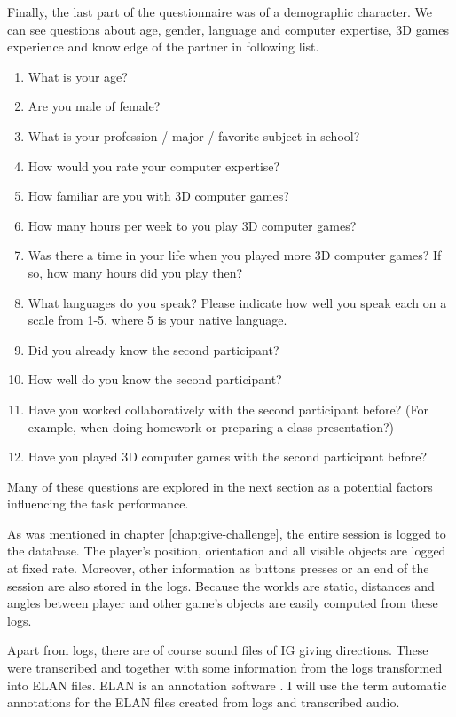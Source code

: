 Finally, the last part of the questionnaire was of a demographic character. We can see questions about age, gender, language and computer expertise, 3D games experience and knowledge of the partner in following list.

\begin{table}
\begin{enumerate}
\item
What is your age?
\item
Are you male of female?
\item
What is your profession / major / favorite subject in school?
\item
How would you rate your computer expertise?
\item
How familiar are you with 3D computer games?
\item
How many hours per week to you play 3D computer games?
\item
Was there a time in your life when you played more 3D computer games? If so, how many hours did you play then?
\item
What languages do you speak? Please indicate how well you speak each on a scale from 1-5, where 5 is your native language.
\item
Did you already know the second participant?
\item
How well do you know the second participant?
\item
Have you worked collaboratively with the second participant before? (For example, when doing homework or preparing a class presentation?)
\item
Have you played 3D computer games with the second participant before?
\end{enumerate}
\end{table}

Many of these questions are explored in the next section as a potential factors influencing the task performance. 

As was mentioned in chapter \ref{chap:give-challenge}, the entire session is logged to the database. The player's position, orientation and all visible objects are logged at fixed rate. Moreover, other information as buttons presses or an end of the session are also stored in the logs. Because the worlds are static, distances and angles between player and other game's objects are easily computed from these logs.

Apart from logs, there are of course sound files of IG giving directions. These were transcribed and together with some information from the logs transformed into ELAN files. ELAN is an annotation software \citep{sloetjes2008annotation}. I will use the term automatic annotations for the ELAN files created from logs and transcribed audio. 

